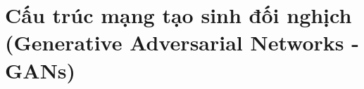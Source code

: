 





\section{\texorpdfstring{Cấu trúc mạng tạo sinh đối nghịch (Generative Adversarial Networks - GANs}{gans})}

